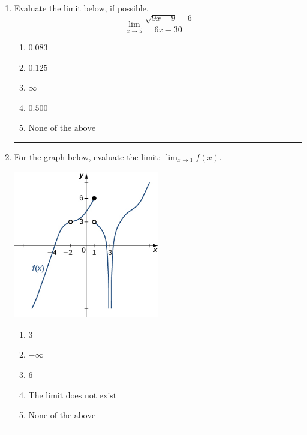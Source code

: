 \documentclass[14pt]{extbook}
\newcommand{\litem}[1]{\item#1\hspace*{-1cm}\rule{\textwidth}{0.4pt}}
\begin{document}
\begin{enumerate}
{\begin{enumerate}[label=\Alph*.]
\end{enumerate} }
\litem{
Evaluate the limit below, if possible.\[ \lim_{x \rightarrow 5} \frac{\sqrt{9x - 9} - 6}{6x - 30} \]\begin{enumerate}[label=\Alph*.]
\item \( 0.083 \)
\item \( 0.125 \)
\item \( \infty \)
\item \( 0.500 \)
\item \( \text{None of the above} \)

\end{enumerate} }
\litem{
For the graph below, evaluate the limit: $ \displaystyle \lim_{x \rightarrow 1} f(x)$.
\begin{center}
    \includegraphics[width=0.5\textwidth]{../Figures/evaluateLimitGraphicallyB.png}
\end{center}
\begin{enumerate}[label=\Alph*.]
\item \( 3 \)
\item \( -\infty \)
\item \( 6 \)
\item \( \text{The limit does not exist} \)
\item \( \text{None of the above} \)


\end{enumerate}}
\end{enumerate}
\end{document}

